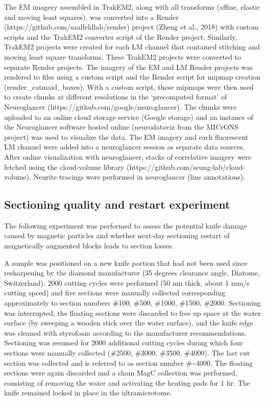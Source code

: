 \documentclass{article}
\begin{document}
The EM imagery assembled in TrakEM2, along with all transforms (affine, elastic and moving least squares), was converted into a Render (https://github.com/saalfeldlab/render) project (Zheng et al., 2018) with custom scripts and the TrakEM2 converter script of the Render project. Similarly, TrakEM2 projects were created for each LM channel that contained stitching and moving least square transforms. These TrakEM2 projects were converted to separate Render projects. The imagery of the EM and LM Render projects was rendered to files using a custom script and the Render script for mipmap creation (render\_catmaid\_boxes). With a custom script, these mipmaps were then used to create chunks at different resolutions in the ‘precomputed format’ of Neuroglancer (https://github.com/google/neuroglancer). The chunks were uploaded to an online cloud storage service (Google storage) and an instance of the Neuroglancer software hosted online (neurodataviz from the MICrONS project) was used to visualize the data. The EM imagery and each fluorescent LM channel were added into a neuroglancer session as separate data sources. After online visualization with neuroglancer, stacks of correlative imagery were fetched using the cloud-volume library (https://github.com/seung-lab/cloud-volume). Neurite tracings were performed in neuroglancer (line annotations).

\subsection*{Sectioning quality and restart experiment}

The following experiment was performed to assess the potential knife damage caused by magnetic particles and whether next-day sectioning restart of magnetically augmented blocks leads to section losses.

A sample was positioned on a new knife portion that had not been used since resharpening by the diamond manufacturer (35 degrees clearance angle, Diatome, Switzerland). 2000 cutting cycles were performed (50 nm thick, about 1 mm/s cutting speed) and five sections were manually collected corresponding approximately to section numbers \#100, \#500, \#1000, \#1500, \#2000. Sectioning was interrupted, the floating sections were discarded to free up space at the water surface (by sweeping a wooden stick over the water surface), and the knife edge was cleaned with styrofoam according to the manufacturer recommendations. Sectioning was resumed for 2000 additional cutting cycles during which four sections were manually collected (\#2500, \#3000, \#3500, \#4000). The last cut section was collected and is referred to as section number \#\textasciitilde4000. The floating sections were again discarded and a sham MagC collection was performed, consisting of removing the water and activating the heating pads for 1 hr. The knife remained locked in place in the ultramicrotome.
\end{document}
